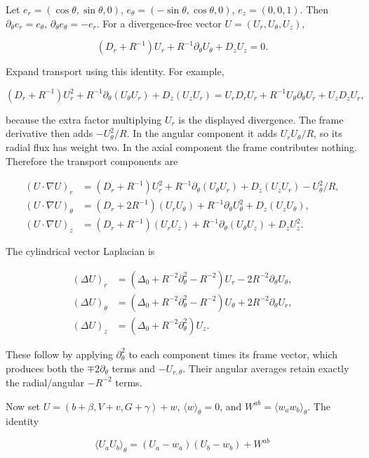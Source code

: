 \documentclass[10pt,a4paper]{article}
\begin{document}
Let \(e_r=(\cos\theta,\sin\theta,0)\), \(e_\theta=(-\sin\theta,\cos\theta,0)\), \(e_z=(0,0,1)\). Then \(\partial_\theta e_r=e_\theta\), \(\partial_\theta e_\theta=-e_r\). For a divergence-free vector \(U=(U_r,U_\theta,U_z)\),

\[
(D_r+R^{-1})U_r+R^{-1}\partial_\theta U_\theta+D_zU_z=0.
\]

Expand transport using this identity. For example,

\[
(D_r+R^{-1})U_r^2+R^{-1}\partial_\theta(U_\theta U_r)+D_z(U_zU_r)
=U_rD_rU_r+R^{-1}U_\theta\partial_\theta U_r+U_zD_zU_r,
\]

because the extra factor multiplying \(U_r\) is the displayed divergence. The frame derivative then adds \(-U_\theta^2/R\). In the angular component it adds \(U_rU_\theta/R\), so its radial flux has weight two. In the axial component the frame contributes nothing. Therefore the transport components are

\[
\begin{aligned}
(U\cdot\nabla U)_r&=(D_r+R^{-1})U_r^2+R^{-1}\partial_\theta(U_\theta U_r)+D_z(U_zU_r)-U_\theta^2/R,\\
(U\cdot\nabla U)_\theta&=(D_r+2R^{-1})(U_rU_\theta)+R^{-1}\partial_\theta U_\theta^2+D_z(U_zU_\theta),\\
(U\cdot\nabla U)_z&=(D_r+R^{-1})(U_rU_z)+R^{-1}\partial_\theta(U_\theta U_z)+D_zU_z^2.
\end{aligned}
\tag{MC11}
\]

The cylindrical vector Laplacian is

\[
\begin{aligned}
(\Delta U)_r&=(\Delta_0+R^{-2}\partial_\theta^2-R^{-2})U_r-2R^{-2}\partial_\theta U_\theta,\\
(\Delta U)_\theta&=(\Delta_0+R^{-2}\partial_\theta^2-R^{-2})U_\theta+2R^{-2}\partial_\theta U_r,\\
(\Delta U)_z&=(\Delta_0+R^{-2}\partial_\theta^2)U_z.
\end{aligned}
\]

These follow by applying \(\partial_\theta^2\) to each component times its frame vector, which produces both the \(\mp2\partial_\theta\) terms and \(-U_{r,\theta}\). Their angular averages retain exactly the radial/angular \(-R^{-2}\) terms.

Now set \(U=(b+\beta,V+v,G+\gamma)+w\), \(\langle w\rangle_\theta=0\), and \(W^{ab}=\langle w_aw_b\rangle_\theta\). The identity

\[
\langle U_aU_b\rangle_\theta=(U_a-w_a)(U_b-w_b)+W^{ab}
\]
\end{document}
